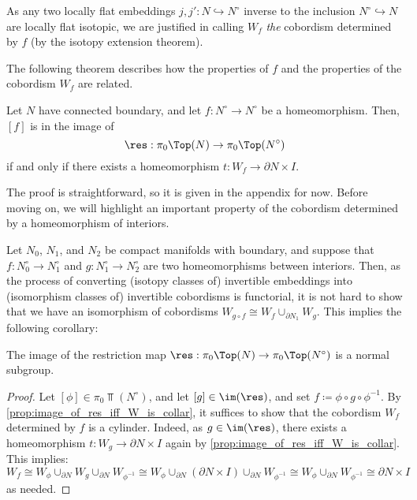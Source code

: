 \begin{remx}
    As any two locally flat embeddings $j,j':N\hookrightarrow N^{\circ}$ inverse to the inclusion $N^{\circ}\hookrightarrow N$ are locally flat isotopic, we are justified in calling $W_f$ \emph{the} cobordism determined by $f$ (by the isotopy extension theorem).    
\end{remx}
   
The following theorem describes how the properties of $f$ and the properties of the cobordism $W_f$ are related. 
\begin{prop}\label{prop:image_of_res_iff_W_is_collar}
Let $N$ have connected boundary, and let $f:N^{\circ}\to N^{\circ}$ be a homeomorphism. Then, $[f]$ is in the image of
    \[
        \res:\pi_0\Top(N)\to\pi_0\Top(N^{\circ})
    \]
    if and only if there exists a homeomorphism $t:W_f\to\partial{N}\times I$.
\end{prop}
The proof is straightforward, so it is given in the appendix for now. Before moving on, we will highlight an important property of the cobordism determined by a homeomorphism of interiors.

Let $N_0$, $N_1$, and $N_2$ be compact manifolds with boundary, and suppose that $f:N_0^{\circ}\to N_1^{\circ}$ and $g:N_1^{\circ}\to N_2^{\circ}$ are two homeomorphisms between interiors. Then, as the process of converting (isotopy classes of) invertible embeddings into (isomorphism classes of) invertible cobordisms is functorial, it is not hard to show that we have an isomorphism of cobordisms $W_{g\circ f}\cong W_f\cup_{\partial{N_1}}W_g$. This implies the following corollary:

\begin{cor}
    The image of the restriction map $\res:\pi_0\Top(N)\to\pi_0\Top(N^{\circ})$ is a normal subgroup.
\end{cor}
\begin{proof}
    Let $[\phi]\in\pi_0\Top(N^{\circ})$, and let $[g]\in\im(\res)$, and set $f\coloneq \phi\circ g\circ\phi^{-1}$. By \cref{prop:image_of_res_iff_W_is_collar}, it suffices to show that the cobordism $W_f$ determined by $f$ is a cylinder. Indeed, as $g\in\im(\res)$, there exists a homeomorphism $t:W_g\to\partial{N}\times I$ again by \cref{prop:image_of_res_iff_W_is_collar}. This implies:  
    \[
        W_f \cong W_{\phi}\cup_{\partial{N}}W_g\cup_{\partial{N}}W_{\phi^{-1}} \cong W_{\phi}\cup_{\partial{N}}(\partial{N}\times I)\cup_{\partial{N}}W_{\phi^{-1}}\cong W_{\phi}\cup_{\partial{N}}W_{\phi^{-1}} \cong \partial{N}\times I
    \]
    as needed. 
\end{proof}

